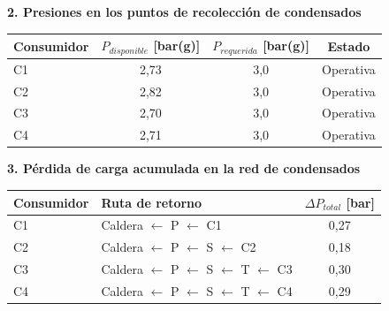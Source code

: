 \documentclass[12pt]{article}
\begin{document}
\begin{landscape}
\begin{table}[H]
		\vspace{1.5cm}

		\begin{minipage}{0.48\linewidth}
			\centering
			\textbf{2. Presiones en los puntos de recolección de condensados}
			\vspace{0.2cm}
			\begin{tabular}{lccc}
				\toprule
				\textbf{Consumidor} & \textbf{$P_{disponible}$ [bar(g)]} & \textbf{$P_{requerida}$ [bar(g)]} & \textbf{Estado} \\
				\midrule
				C1                  & 2,73                               & 3,0                               & Operativa       \\
				C2               & 2,82                               & 3,0                               & Operativa       \\
				C3               & 2,70                               & 3,0                               & Operativa       \\
				C4               & 2,71                               & 3,0                               & Operativa       \\
				\bottomrule
			\end{tabular}
		\end{minipage}
		\hfill
		\begin{minipage}{0.48\linewidth}
			\centering
			\textbf{3. Pérdida de carga acumulada en la red de condensados}
			\vspace{0.2cm}
			\begin{tabular}{llc}
				\toprule
				\textbf{Consumidor} & \textbf{Ruta de retorno}                                                & \textbf{$\Delta P_{total}$ [bar]} \\
				\midrule
				C1                  & Caldera $\leftarrow$ P $\leftarrow$ C1                                  & 0,27                              \\
				C2               & Caldera $\leftarrow$ P $\leftarrow$ S $\leftarrow$ C2                & 0,18                              \\
				C3               & Caldera $\leftarrow$ P $\leftarrow$ S $\leftarrow$ T $\leftarrow$ C3 & 0,30                              \\
				C4               & Caldera $\leftarrow$ P $\leftarrow$ S $\leftarrow$ T $\leftarrow$ C4 & 0,29                              \\
				\bottomrule
			\end{tabular}
		\end{minipage}
	\end{table}
\end{landscape}
\end{document}
